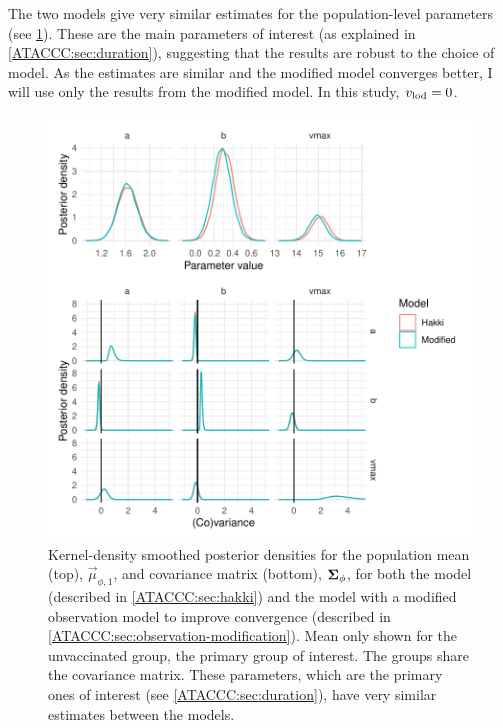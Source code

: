 \documentclass[thesis.tex]{subfiles}
\begin{document}
The two models give very similar estimates for the population-level parameters (see \cref{ATACCC:fig:compare-hakki-modified}).
These are the main parameters of interest (as explained in \cref{ATACCC:sec:duration}), suggesting that the results are robust to the choice of model.
As the estimates are similar and the modified model converges better, I will use only the results from the modified model.
In this study, $v_\text{lod} = 0$.
\begin{figure}
  \centering \includegraphics{ATACCC/compare_hakki_modified}
  \caption[Comparison of population-level parameters between models.]{Kernel-density smoothed posterior densities for the population mean (top), $\vec{\mu}_{\phi,1}$, and covariance matrix (bottom), $\bm{\Sigma}_\phi$, for both the \textcite{hakkiOnset} model (described in \cref{ATACCC:sec:hakki}) and the model with a modified observation model to improve convergence (described in \cref{ATACCC:sec:observation-modification}). Mean only shown for the unvaccinated group, the primary group of interest. The groups share the covariance matrix. These parameters, which are the primary ones of interest (see \cref{ATACCC:sec:duration}), have very similar estimates between the models. \label{ATACCC:fig:compare-hakki-modified}}
\end{figure}
\end{document}
